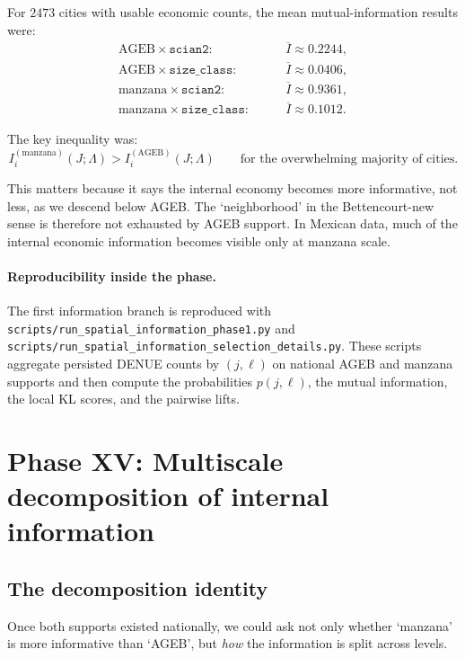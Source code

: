 \documentclass[11pt]{article}
\begin{document}
For \(2473\) cities with usable economic counts, the mean mutual-information results were:
\begin{align}
\text{AGEB} \times \texttt{scian2}: &\qquad \overline{I} \approx 0.2244,\\
\text{AGEB} \times \texttt{size\_class}: &\qquad \overline{I} \approx 0.0406,\\
\text{manzana} \times \texttt{scian2}: &\qquad \overline{I} \approx 0.9361,\\
\text{manzana} \times \texttt{size\_class}: &\qquad \overline{I} \approx 0.1012.
\end{align}

The key inequality was:
\begin{equation}
I_i^{(\text{manzana})}(J;\Lambda)
>
I_i^{(\text{AGEB})}(J;\Lambda)
\qquad\text{for the overwhelming majority of cities.}
\end{equation}

This matters because it says the internal economy becomes more informative, not less, as we descend below AGEB. The `neighborhood' in the Bettencourt-new sense is therefore not exhausted by AGEB support. In Mexican data, much of the internal economic information becomes visible only at manzana scale.

\paragraph{Reproducibility inside the phase.}
The first information branch is reproduced with
\texttt{scripts/run\_spatial\_information\_phase1.py}
and
\texttt{scripts/run\_spatial\_information\_selection\_details.py}.
These scripts aggregate persisted DENUE counts by
\((j,\ell)\)
on national AGEB and manzana supports and then compute the probabilities \(p(j,\ell)\), the mutual information, the local KL scores, and the pairwise lifts.

\section{Phase XV: Multiscale decomposition of internal information}

\subsection{The decomposition identity}

Once both supports existed nationally, we could ask not only whether `manzana' is more informative than `AGEB', but \emph{how} the information is split across levels.
\end{document}
